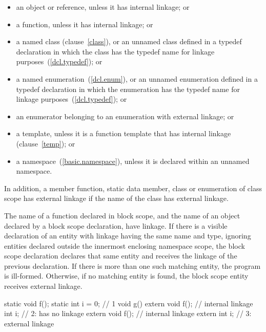 \begin{itemize}
\item an object or reference, unless it has internal linkage; or

\item a function, unless it has internal linkage; or

\item {}%
a named class (clause~\ref{class}), or an unnamed class defined in a
typedef declaration in which the class has the typedef name for linkage
purposes~(\ref{dcl.typedef}); or

\item {}%
a named enumeration~(\ref{dcl.enum}), or an unnamed enumeration defined
in a typedef declaration in which the enumeration has the typedef name
for linkage purposes~(\ref{dcl.typedef}); or

\item an enumerator belonging to an enumeration with external linkage; or

\item a template, unless it is a function template that has internal
linkage (clause~\ref{temp}); or

\item a namespace~(\ref{basic.namespace}), unless it is declared within
an unnamed namespace.
\end{itemize}

\pnum
In addition, a member function, static data member, class or
enumeration of class scope has
external linkage if the name of the class has external linkage.

\pnum
The name of a function declared in block scope, and the name of an object declared by a
block scope  declaration, have linkage. If there is a visible declaration
of an entity with linkage having the same name and type, ignoring entities declared
outside the innermost enclosing namespace scope, the block scope declaration declares
that same entity and receives the linkage of the previous declaration. If there is more
than one such matching entity, the program is ill-formed. Otherwise, if no matching
entity is found, the block scope entity receives external linkage.\\
\enterexample

\begin{codeblock}
static void f();
static int i = 0;			// 1
void g() {
	extern void f();		// internal linkage
	int i;				// 2:  has no linkage
	{
		extern void f();        // internal linkage
		extern int i;           // 3: external linkage
	}
}
\end{codeblock}


